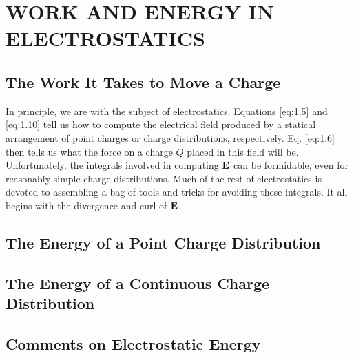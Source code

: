 \chapter{WORK AND ENERGY IN ELECTROSTATICS}\label{ch:4}

\section{The Work It Takes to Move a Charge}\label{sec:4.1} 

In principle, we are  with the subject of electrostatics. Equations \ref{eq:1.5} and \ref{eq:1.10} tell us how to compute the electrical field produced by a statical arrangement of point charges or charge distributions, respectively. Eq. \ref{eq:1.6} then tells us what the force on a charge $Q$ placed in this field will be. Unfortunately, the integrals involved in computing $\vb{E}$ can be formidable, even for reasonably simple charge distributions. Much of the rest of electrostatics is devoted to assembling a bag of tools and tricks for avoiding these integrals. It all begins with the divergence and curl of $\vb{E}$.





\section{The Energy of a Point Charge Distribution}\label{sec:4.2}

\section{The Energy of a Continuous Charge Distribution}\label{sec:4.3}

\section{Comments on Electrostatic Energy}\label{sec:4.4}


 
